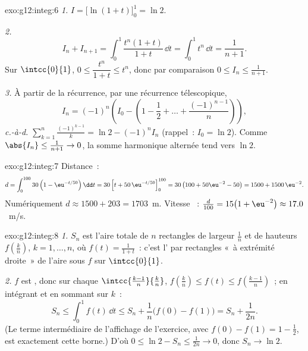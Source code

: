 \begin{solution}{exo:g12:integ:6}
\emph{1.} $I = \bigl[\ln(1+t)\bigr]_0^1 = \ln 2$.

\emph{2.}
\[
I_n + I_{n+1} = \int_0^1 \frac{t^n(1 + t)}{1+t}\,\dd t
= \int_0^1 t^n \,\dd t = \frac{1}{n+1}.
\]
Sur $\intcc{0}{1}$, $0 \leq \dfrac{t^n}{1+t} \leq t^n$, donc par
comparaison $0 \leq I_n \leq \frac{1}{n+1}$.

\emph{3.} À partir de la récurrence, par une récurrence télescopique,
\[
I_n = (-1)^n\left(I_0 - \left(1 - \frac12 + \dots + \frac{(-1)^{n-1}}{n}\right)\right),
\]
\emph{c.-à-d.}
$\displaystyle\sum_{k=1}^{n} \frac{(-1)^{k-1}}{k} = \ln 2 - (-1)^n I_n$
(rappel~: $I_0 = \ln 2$). Comme $\abs{I_n} \leq \frac{1}{n+1} \to 0$, la
somme harmonique alternée tend vers $\ln 2$.
\end{solution}

\begin{solution}{exo:g12:integ:7}
Distance~:
\[
d = \int_0^{100} 30\left(1 - \eu^{-t/50}\right)\dd t
= 30\left[t + 50\,\eu^{-t/50}\right]_0^{100}
= 30\left(100 + 50\eu^{-2} - 50\right)
= 1500 + 1500\,\eu^{-2}.
\]
Numériquement $d \approx 1500 + 203 = 1703$~m. Vitesse ~:
$\frac{d}{100} = 15\bigl(1 + \eu^{-2}\bigr) \approx 17.0$~m/s.
\end{solution}

\begin{solution}{exo:g12:integ:8}
\emph{1.} $S_n$ est l'aire totale de $n$ rectangles de largeur $\frac1n$ et
de hauteurs $f\left(\frac kn\right)$, $k = 1, \dots, n$, où
$f(t) = \frac{1}{1+t}$~: c'est l' par rectangles «~à extrémité
droite~» de l'aire sous $f$ sur $\intcc{0}{1}$.

\emph{2.} $f$ est , donc sur chaque 
$\intcc{\frac{k-1}{n}}{\frac kn}$,
$f\left(\frac kn\right) \leq f(t) \leq f\left(\frac{k-1}{n}\right)$~;
en intégrant et en sommant sur $k$~:
\[
S_n \leq \int_0^1 f(t)\,\dd t \leq S_n + \frac1n\bigl(f(0) - f(1)\bigr)
= S_n + \frac{1}{2n}.
\]
(Le terme intermédiaire de l'affichage de l'exercice, avec
$f(0) - f(1) = 1 - \frac12$, est exactement cette borne.) D'où
$0 \leq \ln 2 - S_n \leq \frac{1}{2n} \to 0$, donc $S_n \to \ln 2$.
\end{solution}

